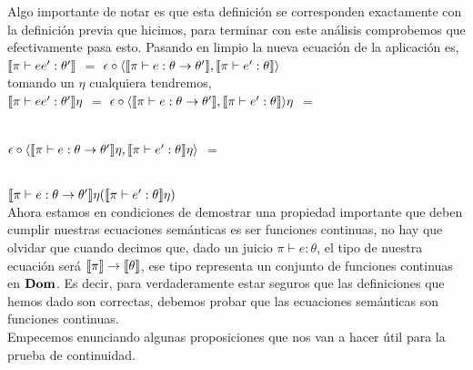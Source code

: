 Algo importante de notar es que esta definici\'on se corresponden exactamente
con la definici\'on previa que hicimos, para terminar con este an\'alisis 
comprobemos que efectivamente pasa esto. Pasando en limpio la nueva ecuaci\'on
de la aplicaci\'on es,\\

$\llbracket \pi \vdash ee' : \theta' \rrbracket$ $=$ 
$\epsilon \circ \langle \llbracket \pi \vdash e : \theta \rightarrow \theta' \rrbracket
									,\llbracket \pi \vdash e' : \theta \rrbracket \rangle$\\
									
tomando un $\eta$ cualquiera tendremos,\\

$\llbracket \pi \vdash ee' : \theta' \rrbracket\eta$ $=$ 
$\epsilon \circ \langle \llbracket \pi \vdash e : \theta \rightarrow \theta' \rrbracket
									,\llbracket \pi \vdash e' : \theta \rrbracket \rangle \eta$ $=$\\
\

$\epsilon \circ \langle \llbracket \pi \vdash e : \theta \rightarrow \theta' \rrbracket\eta
									,\llbracket \pi \vdash e' : \theta \rrbracket\eta \rangle$ $=$\\
\

$\llbracket \pi \vdash e : \theta \rightarrow \theta' \rrbracket\eta
									(\llbracket \pi \vdash e' : \theta \rrbracket \eta)$\\


Ahora estamos en condiciones de demostrar una propiedad importante que deben cumplir nuestras 
ecuaciones sem\'anticas es ser funciones continuas, no hay que olvidar
que cuando decimos que, dado un juicio $\pi \vdash e : \theta$, el tipo
de nuestra ecuaci\'on ser\'a $\llbracket \pi \rrbracket \rightarrow \llbracket \theta \rrbracket$, ese 
tipo representa un conjunto de funciones continuas en $\textbf{Dom}$. Es decir, para
verdaderamente estar seguros que las definiciones que hemos dado son 
correctas, debemos probar que las ecuaciones sem\'anticas son funciones 
continuas.\\

Empecemos enunciando algunas proposiciones que nos van a hacer \'util para
la prueba de continuidad.

